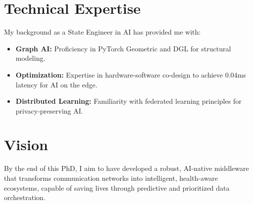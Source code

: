 \documentclass[a4paper,11pt]{article}
\begin{document}
\section{Technical Expertise}
My background as a State Engineer in AI has provided me with:
\begin{itemize}
    \item \textbf{Graph AI:} Proficiency in PyTorch Geometric and DGL for structural modeling.
    \item \textbf{Optimization:} Expertise in hardware-software co-design to achieve 0.04ms latency for AI on the edge.
    \item \textbf{Distributed Learning:} Familiarity with federated learning principles for privacy-preserving AI.
\end{itemize}

\section{Vision}
By the end of this PhD, I aim to have developed a robust, AI-native middleware that transforms communication networks into intelligent, health-aware ecosystems, capable of saving lives through predictive and prioritized data orchestration.
\end{document}
